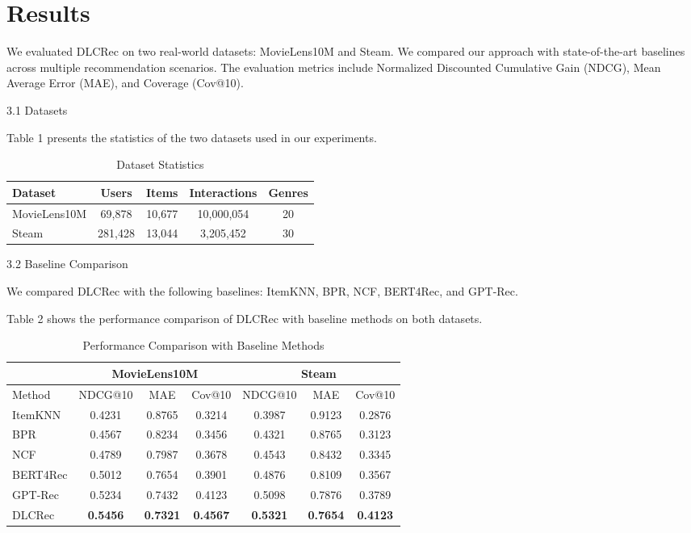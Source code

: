 \documentclass[12pt,letterpaper]{article}
\begin{document}
\section{Results}

We evaluated DLCRec on two real-world datasets: MovieLens10M and Steam. We compared our approach with state-of-the-art baselines across multiple recommendation scenarios. The evaluation metrics include Normalized Discounted Cumulative Gain (NDCG), Mean Average Error (MAE), and Coverage (Cov@10).

3.1 Datasets

Table 1 presents the statistics of the two datasets used in our experiments.

\begin{table}[h]
\centering
\begin{tabular}{|l|c|c|c|c|}
\hline
Dataset & Users & Items & Interactions & Genres \\
\hline
MovieLens10M & 69,878 & 10,677 & 10,000,054 & 20 \\
Steam & 281,428 & 13,044 & 3,205,452 & 30 \\
\hline
\end{tabular}
\caption{Dataset Statistics}
\end{table}

3.2 Baseline Comparison

We compared DLCRec with the following baselines: ItemKNN, BPR, NCF, BERT4Rec, and GPT-Rec.

Table 2 shows the performance comparison of DLCRec with baseline methods on both datasets.

\begin{table}[h]
\centering
\begin{tabular}{|l|c|c|c|c|c|c|}
\hline
& \multicolumn{3}{c|}{MovieLens10M} & \multicolumn{3}{c|}{Steam} \\
\hline
Method & NDCG@10 & MAE & Cov@10 & NDCG@10 & MAE & Cov@10 \\
\hline
ItemKNN & 0.4231 & 0.8765 & 0.3214 & 0.3987 & 0.9123 & 0.2876 \\
BPR & 0.4567 & 0.8234 & 0.3456 & 0.4321 & 0.8765 & 0.3123 \\
NCF & 0.4789 & 0.7987 & 0.3678 & 0.4543 & 0.8432 & 0.3345 \\
BERT4Rec & 0.5012 & 0.7654 & 0.3901 & 0.4876 & 0.8109 & 0.3567 \\
GPT-Rec & 0.5234 & 0.7432 & 0.4123 & 0.5098 & 0.7876 & 0.3789 \\
DLCRec & \textbf{0.5456} & \textbf{0.7321} & \textbf{0.4567} & \textbf{0.5321} & \textbf{0.7654} & \textbf{0.4123} \\
\hline
\end{tabular}
\caption{Performance Comparison with Baseline Methods}
\end{table}
\end{document}
